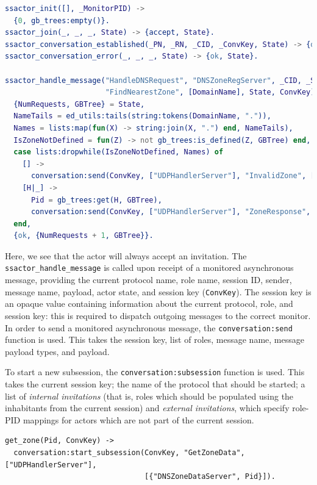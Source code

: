 \documentclass[a4paper]{article}
\begin{document}
\begin{lstlisting}[language=erlang]
ssactor_init([], _MonitorPID) ->
  {0, gb_trees:empty()}.
ssactor_join(_, _, _, State) -> {accept, State}.
ssactor_conversation_established(_PN, _RN, _CID, _ConvKey, State) -> {ok, State}.
ssactor_conversation_error(_, _, _, State) -> {ok, State}.

ssactor_handle_message("HandleDNSRequest", "DNSZoneRegServer", _CID, _Sender,
                       "FindNearestZone", [DomainName], State, ConvKey) ->
  {NumRequests, GBTree} = State,
  NameTails = ed_utils:tails(string:tokens(DomainName, ".")),
  Names = lists:map(fun(X) -> string:join(X, ".") end, NameTails),
  IsZoneNotDefined = fun(Z) -> not gb_trees:is_defined(Z, GBTree) end,
  case lists:dropwhile(IsZoneNotDefined, Names) of
    [] ->
      conversation:send(ConvKey, ["UDPHandlerServer"], "InvalidZone", [], []);
    [H|_] ->
      Pid = gb_trees:get(H, GBTree),
      conversation:send(ConvKey, ["UDPHandlerServer"], "ZoneResponse", ["ZonePID"], [Pid])
  end,
  {ok, {NumRequests + 1, GBTree}}.
\end{lstlisting}

Here, we see that the actor will always accept an invitation. The \texttt{ssactor\_handle\_message} is called upon receipt of a monitored asynchronous message, providing the current protocol name, role name, session ID, sender, message name, payload, actor state, and session key (\texttt{ConvKey}). The session key is an opaque value containing information about the current protocol, role, and session key: this is required to dispatch outgoing messages to the correct monitor.
In order to send a monitored asynchronous message, the \texttt{conversation:send} function is used. This takes the session key, list of roles, message name, message payload types, and payload.

To start a new subsession, the \texttt{conversation:subsession} function is used. This takes the current session key; the name of the protocol that should be started; a list of \emph{internal invitations} (that is, roles which should be populated using the inhabitants from the current session) and \emph{external invitations}, which specify role-PID mappings for actors which are not part of the current session.

\begin{lstlisting}
get_zone(Pid, ConvKey) ->
  conversation:start_subsession(ConvKey, "GetZoneData", ["UDPHandlerServer"],
                                [{"DNSZoneDataServer", Pid}]).
\end{lstlisting}
\end{document}
